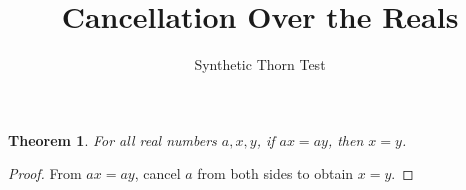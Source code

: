 \documentclass{article}
\newtheorem{theorem}{Theorem}
\begin{document}
\title{Cancellation Over the Reals}
\author{Synthetic Thorn Test}
\maketitle

\begin{theorem}\label{thm:missing-hypothesis}
For all real numbers $a,x,y$, if $ax=ay$, then $x=y$.
\end{theorem}
\begin{proof}
From $ax=ay$, cancel $a$ from both sides to obtain $x=y$.
\end{proof}
\end{document}

